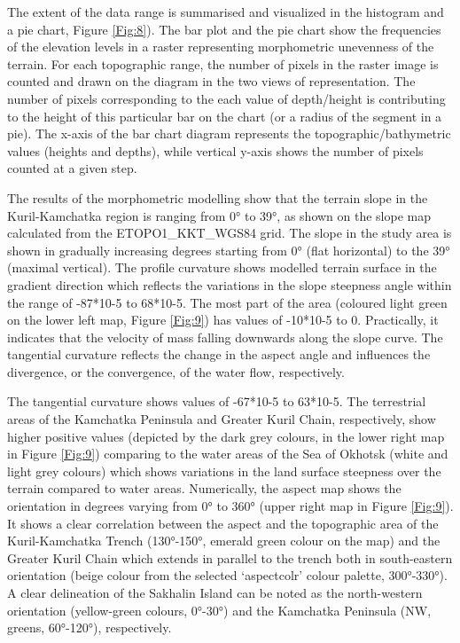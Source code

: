 \documentclass[technologies,article,submit,pdftex,moreauthors]{Definitions/mdpi}
\begin{document}
The extent of the data range is summarised and visualized in the histogram and a pie chart, Figure \ref{Fig:8}). The bar plot and the pie chart show the frequencies of the elevation levels in a raster representing morphometric unevenness of the terrain. For each topographic range, the number of pixels in the raster image is counted and drawn on the diagram in the two views of representation. The number of pixels corresponding to the each value of depth/height is contributing to the height of this particular bar on the chart (or a radius of the segment in a pie). The x-axis of the bar chart diagram represents the topographic/bathymetric values (heights and depths), while vertical y-axis shows the number of pixels counted at a given step.

The results of the morphometric modelling show that the terrain slope in the Kuril-Kamchatka region is ranging from 0° to 39°, as shown on the slope map calculated from the ETOPO1\_KKT\_WGS84 grid. The slope in the study area is shown in gradually increasing degrees starting from 0° (flat horizontal) to the 39° (maximal vertical). The profile curvature shows modelled terrain surface in the gradient direction which reflects the variations in the slope steepness angle within the range of -87*10-5 to 68*10-5. The most part of the area (coloured light green on the lower left map, Figure \ref{Fig:9}) has values of -10*10-5 to 0. Practically, it indicates that the velocity of mass falling downwards along the slope curve. The tangential curvature reflects the change in the aspect angle and influences the divergence, or the convergence, of the water flow, respectively.

The tangential curvature shows values of -67*10-5 to 63*10-5. The terrestrial areas of the Kamchatka Peninsula and Greater Kuril Chain, respectively, show higher positive values (depicted by the dark grey colours, in the lower right map in Figure \ref{Fig:9}) comparing to the water areas of the Sea of Okhotsk (white and light grey colours) which shows variations in the land surface steepness over the terrain compared to water areas. Numerically, the aspect map shows the orientation in degrees varying from 0° to 360° (upper right map in Figure \ref{Fig:9}). It shows a clear correlation between the aspect and the topographic area of the Kuril-Kamchatka Trench (130°-150°, emerald green colour on the map) and the Greater Kuril Chain which extends in parallel to the trench both in south-eastern orientation (beige colour from the selected ‘aspectcolr’ colour palette, 300°-330°). A clear delineation of the Sakhalin Island can be noted as the north-western orientation (yellow-green colours, 0°-30°) and the Kamchatka Peninsula (NW, greens, 60°-120°), respectively.
\end{document}
